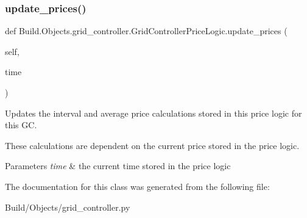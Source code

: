 \subsubsection{\texorpdfstring{update\+\_\+prices()}{update\_prices()}}
{\footnotesize\ttfamily def Build.\+Objects.\+grid\+\_\+controller.\+Grid\+Controller\+Price\+Logic.\+update\+\_\+prices (\begin{DoxyParamCaption}\item[{}]{self,  }\item[{}]{time }\end{DoxyParamCaption})}



Updates the interval and average price calculations stored in this price logic for this GC. 

These calculations are dependent on the current price stored in the price logic. 
\begin{DoxyParams}{Parameters}
{\em time} & the current time stored in the price logic \\
\hline
\end{DoxyParams}


The documentation for this class was generated from the following file\+:\begin{DoxyCompactItemize}
\item 
Build/\+Objects/grid\+\_\+controller.\+py\end{DoxyCompactItemize}

